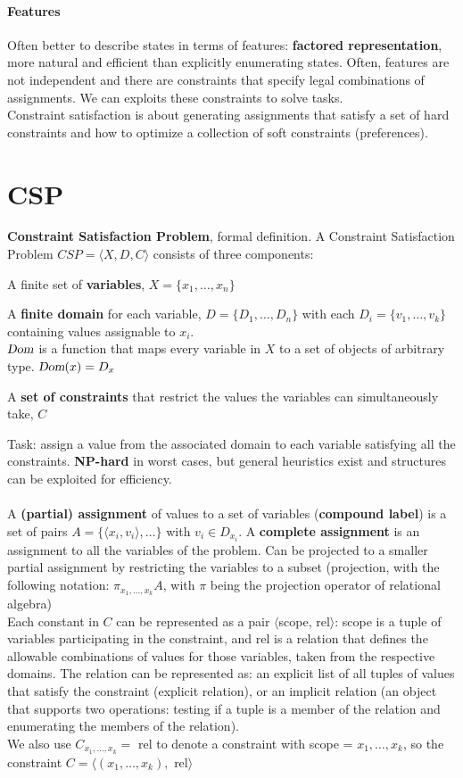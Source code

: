 \documentclass[10pt]{report}
\begin{document}
\paragraph{Features} Often better to describe states in terms of features: \textbf{factored representation}, more natural and efficient than explicitly enumerating states. Often, features are not independent and there are constraints that specify legal combinations of assignments. We can exploits these constraints to solve tasks.\\
Constraint satisfaction is about generating assignments that satisfy a set of hard constraints and how to optimize a collection of soft constraints (preferences).
\section{CSP} \textbf{Constraint Satisfaction Problem}, formal definition.
A Constraint Satisfaction Problem $CSP = \langle X, D, C\rangle$ consists of three components: \begin{list}{}{}
	\item A finite set of \textbf{variables}, $X = \{x_1, \ldots, x_n\}$
	\item A \textbf{finite domain} for each variable, $D = \{D_1, \ldots, D_n\}$ with each $D_i = \{v_1, \ldots, v_k\}$ containing values assignable to $x_i$.\\
	$\textsl{Dom}$ is a function that maps every variable in $X$ to a set of objects of arbitrary type. $\textsl{Dom}(x) = D_x$
	\item A \textbf{set of constraints} that restrict the values the variables can simultaneously take, $C$
\end{list}
Task: assign a value from the associated domain to each variable satisfying all the constraints. \textbf{NP-hard} in worst cases, but general heuristics exist and structures can be exploited for efficiency.\\\\
A \textbf{(partial) assignment} of values to a set of variables (\textbf{compound label}) is a set of pairs $A=\{\langle x_i, v_i\rangle, \ldots\}$ with $v_i \in D_{x_i}$. A \textbf{complete assignment} is an assignment to all the variables of the problem. Can be projected to a smaller partial assignment by restricting the variables to a subset (projection, with the following notation: $\pi_{x_1,\ldots,x_k} A$, with $\pi$ being the projection operator of relational algebra)\\
Each constant in $C$ can be represented as a pair $\langle$scope, rel$\rangle$: scope is a tuple of variables participating in the constraint, and rel is a relation that defines the allowable combinations of values for those variables, taken from the respective domains. The relation can be represented as: an explicit list of all tuples of values that satisfy the constraint (explicit relation), or an implicit relation (an object that supports two operations: testing if a tuple is a member of the relation and enumerating the members of the relation).\\
We also use $C_{x_1,\ldots,x_k} =$ rel to denote a constraint with scope = $x_1,\ldots,x_k$, so the constraint $C=\langle(x_1,\ldots,x_k),$ rel$\rangle$
\end{document}
